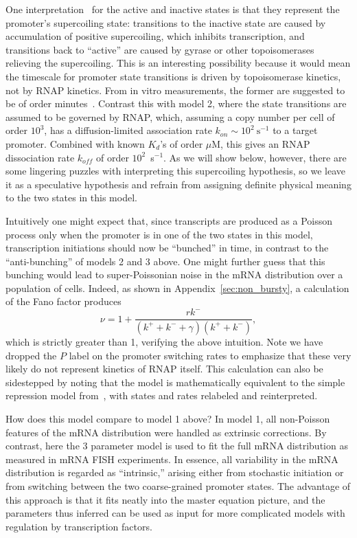 One interpretation~\cite{Chong2014, Sevier2016, Sevier2018} for the active and
inactive states is that they represent the promoter's supercoiling state:
transitions to the inactive state are caused by accumulation of positive
supercoiling, which inhibits transcription, and transitions back to ``active''
are caused by gyrase or other topoisomerases relieving the supercoiling. This is
an interesting possibility because it would mean the timescale for promoter
state transitions is driven by topoisomerase kinetics, not by RNAP kinetics.
From in vitro measurements, the former are suggested to be of order
minutes~\cite{Chong2014}. Contrast this with model 2, where the state
transitions are assumed to be governed by RNAP, which, assuming a copy number
per cell of order $10^3$, has a diffusion-limited association rate $k_{on} \sim
10^2~\text{s}^{-1}$ to a target promoter. Combined with known $K_d$'s of order
$\mu$M, this gives an RNAP dissociation rate $k_{off}$ of order $10^2$~s$^{-1}$.
As we will show below, however, there are some lingering puzzles with
interpreting this supercoiling hypothesis, so we leave it as a speculative
hypothesis and refrain from assigning definite physical meaning to the two
states in this model.

Intuitively one might expect that, since transcripts are produced as a Poisson
process only when the promoter is in one of the two states in this model,
transcription initiations should now be ``bunched'' in time, in contrast to the
``anti-bunching'' of models 2 and 3 above. One might further guess that this
bunching would lead to super-Poissonian noise in the mRNA distribution over a
population of cells.  Indeed, as shown in Appendix~\ref{sec:non_bursty}, a
calculation of the Fano factor produces
\begin{equation}
\nu = 1 + \frac{r k^-}{(k^+ + k^- + \gamma)(k^+ + k^-)},
\label{eq:model4_fano}
\end{equation}
which is strictly greater than 1, verifying the above intuition. Note we have
dropped the $P$ label on the promoter switching rates to emphasize that these
very likely do not represent kinetics of RNAP itself. This calculation can also
be sidestepped by noting that the model is mathematically equivalent to the
simple repression model from~\cite{Jones2014}, with states and rates relabeled
and reinterpreted.

How does this model compare to model 1 above? In model 1, all non-Poisson
features of the mRNA distribution were handled as extrinsic corrections. By
contrast, here the 3 parameter model is used to fit the full mRNA distribution
as measured in mRNA FISH experiments. In essence, all variability in the mRNA
distribution is regarded as ``intrinsic,'' arising either from stochastic
initiation or from switching between the two coarse-grained promoter states. The
advantage of this approach is that it fits neatly into the master equation
picture, and the parameters thus inferred can be used as input for more
complicated models with regulation by transcription factors.

